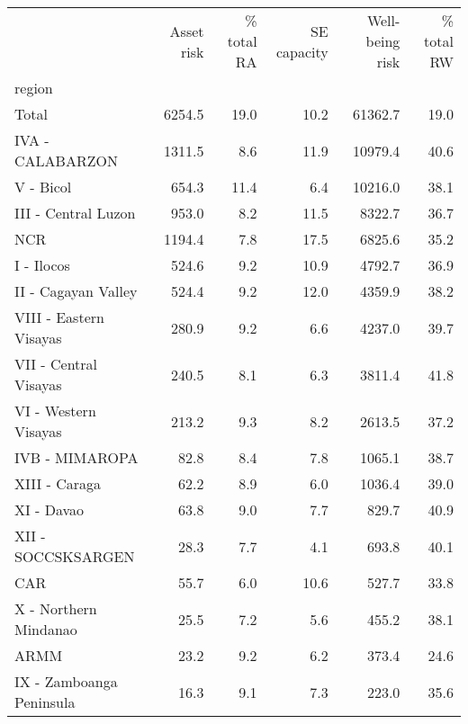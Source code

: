 \begin{tabular}{lrrrrr}
\toprule
{} &  Asset risk &  \% total RA &  SE capacity &  Well-being risk &  \% total RW \\
region                   &             &             &              &                  &             \\
\midrule
Total                    &      6254.5 &        19.0 &         10.2 &          61362.7 &        19.0 \\
IVA - CALABARZON         &      1311.5 &         8.6 &         11.9 &          10979.4 &        40.6 \\
V - Bicol                &       654.3 &        11.4 &          6.4 &          10216.0 &        38.1 \\
III - Central Luzon      &       953.0 &         8.2 &         11.5 &           8322.7 &        36.7 \\
NCR                      &      1194.4 &         7.8 &         17.5 &           6825.6 &        35.2 \\
I - Ilocos               &       524.6 &         9.2 &         10.9 &           4792.7 &        36.9 \\
II - Cagayan Valley      &       524.4 &         9.2 &         12.0 &           4359.9 &        38.2 \\
VIII - Eastern Visayas   &       280.9 &         9.2 &          6.6 &           4237.0 &        39.7 \\
VII - Central Visayas    &       240.5 &         8.1 &          6.3 &           3811.4 &        41.8 \\
VI - Western Visayas     &       213.2 &         9.3 &          8.2 &           2613.5 &        37.2 \\
IVB - MIMAROPA           &        82.8 &         8.4 &          7.8 &           1065.1 &        38.7 \\
XIII - Caraga            &        62.2 &         8.9 &          6.0 &           1036.4 &        39.0 \\
XI - Davao               &        63.8 &         9.0 &          7.7 &            829.7 &        40.9 \\
XII - SOCCSKSARGEN       &        28.3 &         7.7 &          4.1 &            693.8 &        40.1 \\
CAR                      &        55.7 &         6.0 &         10.6 &            527.7 &        33.8 \\
X - Northern Mindanao    &        25.5 &         7.2 &          5.6 &            455.2 &        38.1 \\
ARMM                     &        23.2 &         9.2 &          6.2 &            373.4 &        24.6 \\
IX - Zamboanga Peninsula &        16.3 &         9.1 &          7.3 &            223.0 &        35.6 \\
\bottomrule
\end{tabular}
